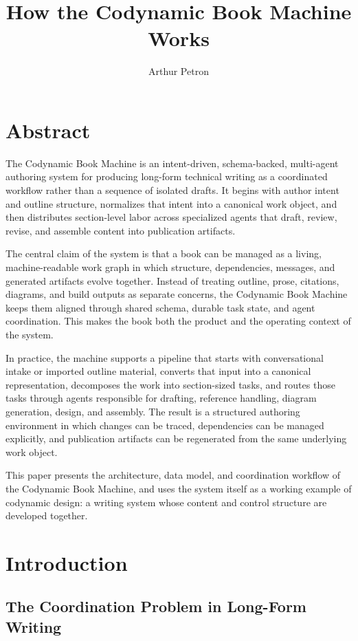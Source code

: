 \documentclass[11pt]{article}
\title{How the Codynamic Book Machine Works}
\author{Arthur Petron}
\begin{document}
\section{Abstract}


The Codynamic Book Machine is an intent-driven, schema-backed, multi-agent authoring system for producing long-form technical writing as a coordinated workflow rather than a sequence of isolated drafts. It begins with author intent and outline structure, normalizes that intent into a canonical work object, and then distributes section-level labor across specialized agents that draft, review, revise, and assemble content into publication artifacts.

The central claim of the system is that a book can be managed as a living, machine-readable work graph in which structure, dependencies, messages, and generated artifacts evolve together. Instead of treating outline, prose, citations, diagrams, and build outputs as separate concerns, the Codynamic Book Machine keeps them aligned through shared schema, durable task state, and agent coordination. This makes the book both the product and the operating context of the system.

In practice, the machine supports a pipeline that starts with conversational intake or imported outline material, converts that input into a canonical representation, decomposes the work into section-sized tasks, and routes those tasks through agents responsible for drafting, reference handling, diagram generation, design, and assembly. The result is a structured authoring environment in which changes can be traced, dependencies can be managed explicitly, and publication artifacts can be regenerated from the same underlying work object.

This paper presents the architecture, data model, and coordination workflow of the Codynamic Book Machine, and uses the system itself as a working example of codynamic design: a writing system whose content and control structure are developed together.



\section{Introduction}

\subsection{The Coordination Problem in Long-Form Writing}
\end{document}
